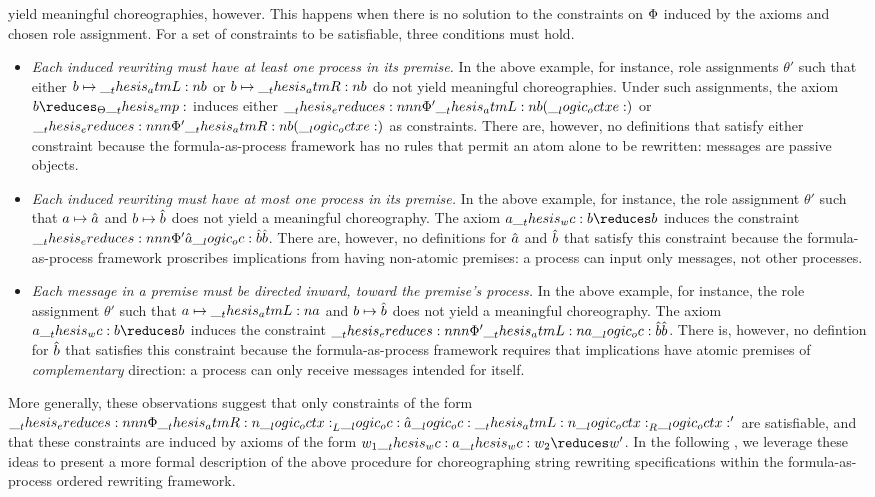  yield meaningful choreographies, however.
This happens when there is no solution to the constraints on $\Phi$ induced by the axioms and chosen role assignment.
For a set of constraints to be satisfiable, three conditions must hold.
\begin{itemize}
\item
  \emph{Each induced rewriting must have at least one process in its premise.}
  In the above example, for instance, role assignments $\theta'$ such that either $b \mapsto \__thesis_atmL:n {b}$ or $b \mapsto \__thesis_atmR:n {b}$ do not yield meaningful choreographies.
  Under such assignments, the axiom $b \reduces_{\srsig} \emp$ induces either $\ereduces[\orsig']{\atmL{b}}{(\octxe)}$ or $\ereduces[\orsig']{\atmR{b}}{(\octxe)}$ as constraints.
  There are, however, no definitions that satisfy either constraint because the formula-as-process framework has no rules that permit an atom alone to be rewritten: messages are passive objects.

\item
  \emph{Each induced rewriting must have at most one process in its premise.}
  In the above example, for instance, the role assignment $\theta'$ such that $a \mapsto \hat{a}$ and $b \mapsto \hat{b}$ does not yield a meaningful choreography.
  The axiom $a \wc b \reduces b$ induces the constraint $\ereduces[\orsig']{\defp{a} \oc \defp{b}}{\defp{b}}$.
  There are, however, no definitions for $\hat{a}$ and $\hat{b}$ that satisfy this constraint because the formula-as-process framework proscribes implications from having non-atomic premises: a process can input only messages, not other processes.

\item
  \emph{Each message in a premise must be directed inward, toward the premise's process.}
  In the above example, for instance, the role assignment $\theta'$ such that $a \mapsto \__thesis_atmL:n {a}$ and $b \mapsto \hat{b}$ does not yield a meaningful choreography.
  The axiom $a \wc b \reduces b$ induces the constraint $\ereduces[\orsig']{\atmL{a} \oc \defp{b}}{\defp{b}}$.
  There is, however, no defintion for $\hat{b}$ that satisfies this constraint because the formula-as-process framework requires that implications have atomic premises of \emph{complementary} direction: a process can only receive messages intended for itself.
\end{itemize}

More generally, these observations suggest that only constraints of the form $\ereduces[\orsig]{\atmR{\octx}_L \oc \defp{a} \oc \atmL{\octx}_R}{\octx'}$ are satisfiable, and that these constraints are induced by axioms of the form $w_1 \wc a \wc w_2 \reduces w'$.
In the following , we leverage these ideas to present a more formal description of the above procedure for choreographing string rewriting specifications within the formula-as-process ordered rewriting framework.

